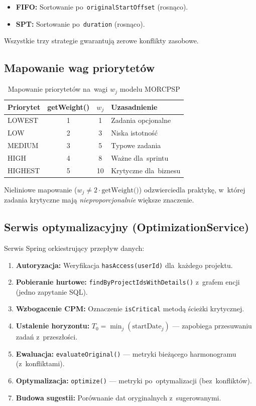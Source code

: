 \begin{itemize}
    \item \textbf{FIFO:} Sortowanie po~\texttt{originalStartOffset} (rosnąco).
    \item \textbf{SPT:} Sortowanie po~\texttt{duration} (rosnąco).
\end{itemize}

Wszystkie trzy strategie gwarantują zerowe konflikty zasobowe.

\subsection{Mapowanie wag priorytetów}

\begin{table}[H]
\centering
\caption{Mapowanie priorytetów na~wagi $w_j$ modelu MORCPSP}
\label{tab:priority_weights}
\begin{tabular}{|l|c|c|l|}
\hline
\textbf{Priorytet} & \textbf{getWeight()} & $w_j$ & \textbf{Uzasadnienie} \\ \hline
LOWEST & 1 & 1 & Zadania opcjonalne \\ \hline
LOW & 2 & 3 & Niska istotność \\ \hline
MEDIUM & 3 & 5 & Typowe zadania \\ \hline
HIGH & 4 & 8 & Ważne dla~sprintu \\ \hline
HIGHEST & 5 & 10 & Krytyczne dla~biznesu \\ \hline
\end{tabular}
\end{table}

Nieliniowe mapowanie ($w_j \neq 2 \cdot \text{getWeight()}$) odzwierciedla praktykę, w~której zadania krytyczne mają \textit{nieproporcjonalnie} większe znaczenie.

\subsection{Serwis optymalizacyjny (OptimizationService)}

Serwis Spring orkiestrujący przepływ danych:

\begin{enumerate}
    \item \textbf{Autoryzacja:} Weryfikacja \texttt{hasAccess(userId)} dla~każdego projektu.
    \item \textbf{Pobieranie hurtowe:} \texttt{findByProjectIdsWithDetails()} z~grafem encji (jedno zapytanie SQL).
    \item \textbf{Wzbogacenie CPM:} Oznaczenie \texttt{isCritical} metodą ścieżki krytycznej.
    \item \textbf{Ustalenie horyzontu:} $T_0 = \min_j(\text{startDate}_j)$ --- zapobiega przesuwaniu zadań z~przeszłości.
    \item \textbf{Ewaluacja:} \texttt{evaluateOriginal()} --- metryki bieżącego harmonogramu (z~konfliktami).
    \item \textbf{Optymalizacja:} \texttt{optimize()} --- metryki po~optymalizacji (bez~konfliktów).
    \item \textbf{Budowa sugestii:} Porównanie dat oryginalnych z~sugerowanymi.
\end{enumerate}

